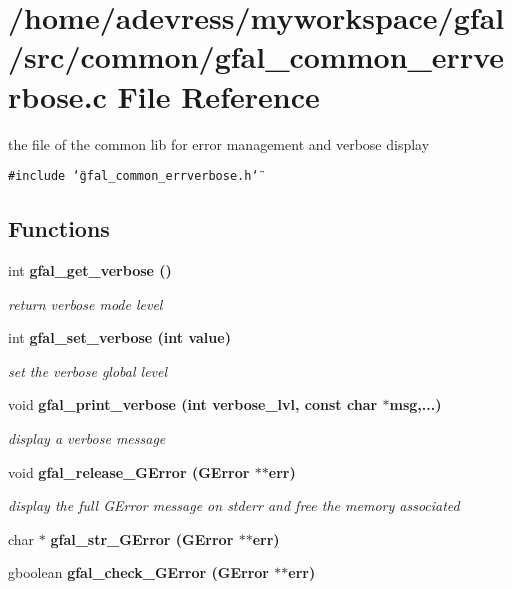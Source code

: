 \section{/home/adevress/myworkspace/gfal/src/common/gfal\_\-common\_\-errverbose.c File Reference}
\label{gfal__common__errverbose_8c}
the file of the common lib for error management and verbose display 

{\tt \#include \char`\"{}gfal\_\-common\_\-errverbose.h\char`\"{}}\par
\subsection*{Functions}
\begin{CompactItemize}
\item 
int \bf{gfal\_\-get\_\-verbose} ()\label{gfal__common__errverbose_8c_135b3fdd775aa7215e2ab4de1eea495f}

\begin{CompactList}\small\item\em return verbose mode level \item\end{CompactList}\item 
int \bf{gfal\_\-set\_\-verbose} (int value)
\begin{CompactList}\small\item\em set the verbose global level \item\end{CompactList}\item 
void \bf{gfal\_\-print\_\-verbose} (int verbose\_\-lvl, const char $\ast$msg,...)
\begin{CompactList}\small\item\em display a verbose message \item\end{CompactList}\item 
void \bf{gfal\_\-release\_\-GError} (GError $\ast$$\ast$err)\label{gfal__common__errverbose_8c_1441ea4b8176eb0cf3099009b950a3e9}

\begin{CompactList}\small\item\em display the full GError message on stderr and free the memory associated \item\end{CompactList}\item 
char $\ast$ \bf{gfal\_\-str\_\-GError} (GError $\ast$$\ast$err)
\item 
gboolean \bf{gfal\_\-check\_\-GError} (GError $\ast$$\ast$err)\label{gfal__common__errverbose_8c_9167aee5bda42b71a982f863e88f7bfd}


\end{CompactItemize}
